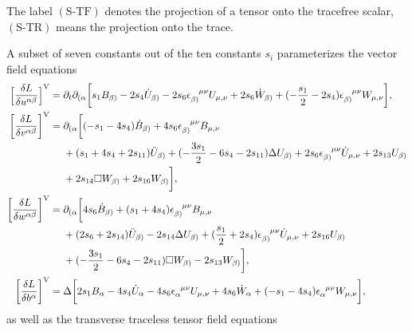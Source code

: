 \endgroup
The label $(\text{S-TF})$ denotes the projection of a tensor onto the tracefree scalar, $(\text{S-TR})$ means the projection onto the trace.

A subset of seven constants out of the ten constants $s_i$ parameterizes the vector field equations
\begingroup\allowdisplaybreaks
\begin{align}\footnotesize
 \bigg\lbrack\frac{\delta L}{\delta u^{\alpha\beta}}\bigg\rbrack^\text{V} = {} & \partial_t \partial_{(\alpha} \bigg\lbrack s_1 B_{\beta)} - 2s_4 \dot U_{\beta)} - 2s_6 \epsilon_{\beta)}^{\hphantom{\beta)}\mu\nu} U_{\mu,\nu} + 2s_6 \dot W_{\beta)} + (-\frac{s_1}{2} - 2s_4) \epsilon_{\beta)}^{\hphantom{\beta)}\mu\nu} W_{\mu,\nu} \bigg\rbrack, \nonumber \\
 \bigg\lbrack\frac{\delta L}{\delta v^{\alpha\beta}}\bigg\rbrack^\text{V} = {} & \partial_{(\alpha} \bigg\lbrack (-s_1 - 4s_4) \dot B_{\beta)} + 4s_6 \epsilon_{\beta)}^{\hphantom{\beta)}\mu\nu} B_{\mu,\nu} \nonumber \\ & + (s_1 + 4s_4 + 2s_{11}) \ddot U_{\beta)} + (-\frac{3s_1}{2} - 6s_4 - 2s_{11}) \Delta U_{\beta)} + 2s_6 \epsilon_{\beta)}^{\hphantom{\beta)}\mu\nu} \dot U_{\mu,\nu} + 2s_{13} U_{\beta)} \nonumber \\ & + 2 s_{14} \Box W_{\beta)} + 2 s_{16} W_{\beta)} \bigg\rbrack, \nonumber \\
 \bigg\lbrack\frac{\delta L}{\delta w^{\alpha\beta}}\bigg\rbrack^\text{V} = {} & \partial_{(\alpha} \bigg\lbrack 4s_6 \dot B_{\beta)} + (s_1 + 4s_4) \epsilon_{\beta)}^{\hphantom{\beta)}\mu\nu} B_{\mu,\nu} \nonumber \\ & + (2s_6 + 2 s_{14}) \ddot U_{\beta)} - 2 s_{14} \Delta U_{\beta)} + (\frac{s_1}{2} + 2 s_4) \epsilon_{\beta)}^{\hphantom{\beta)}\mu\nu} \dot U_{\mu,\nu} + 2 s_{16} U_{\beta)} \nonumber \\ & + (-\frac{3s_1}{2} - 6s_4 - 2s_{11}) \Box W_{\beta)} - 2s_{13} W_{\beta)} \bigg\rbrack, \nonumber \\
 \bigg\lbrack\frac{\delta L}{\delta b^\alpha}\bigg\rbrack^\text{V} = {} & \Delta\bigg\lbrack 2s_1 B_{\alpha} - 4s_4 \dot U_{\alpha} - 4s_6 \epsilon_{\alpha}^{\hphantom{\alpha}\mu\nu} U_{\mu,\nu} + 4s_6 \dot W_{\alpha} + (-s_1 - 4s_4) \epsilon_{\alpha}^{\hphantom{\alpha}\mu\nu} W_{\mu,\nu} \bigg\rbrack, \label{vector_equations}
\end{align}%
\endgroup
as well as the transverse traceless tensor field equations
\begingroup\allowdisplaybreaks
